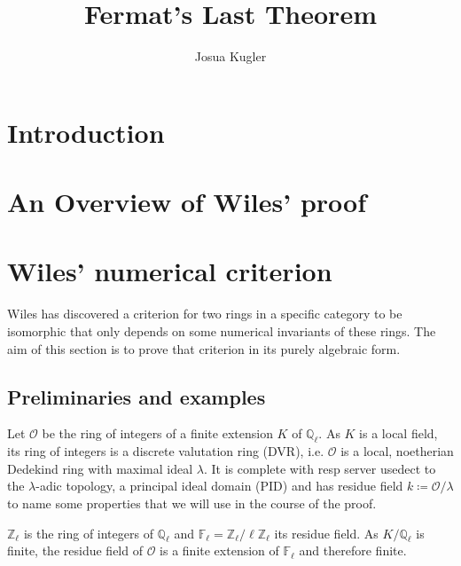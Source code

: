 \documentclass{article}
\title{Fermat's Last Theorem}
\author{Josua Kugler}
\theoremstyle{plain}%
\theoremstyle{definition}
\theoremstyle{remark}
\begin{document}
    \maketitle
    \tableofcontents
    \section{Introduction}
    \section{An Overview of Wiles' proof}
    \newpage
    \section{Wiles' numerical criterion}
    Wiles has discovered a criterion for two rings in a specific category to be isomorphic that only depends on some numerical invariants
    of these rings. The aim of this section is to prove that criterion in its purely algebraic form. 
    
    \subsection{Preliminaries and examples}
    Let \(\mathcal{O}\) be the ring of integers of a finite extension \(K\) of \(\mathbb Q_\ell\). 
    As \(K\) is a local field, its ring of integers is a discrete valutation ring (DVR), i.e. 
    \(\mathcal O\) is a local, noetherian Dedekind ring with maximal ideal \(\lambda\). 
    It is complete with resp server usedect to the \(\lambda\)-adic topology, a principal ideal domain (PID) 
    and has residue field \(k \coloneqq \mathcal{O}/\lambda\)  to name some properties that we will use in the course of the proof.
    
    \(\mathbb Z_\ell\) is the ring of integers of \(\mathbb Q_\ell\) and \(\mathbb F_\ell = \mathbb Z_\ell/\ell \mathbb Z_\ell\) its residue field. 
    As \(K/\mathbb{Q}_\ell\) is finite, the residue field of \(\mathcal{O}\) is a finite extension of $\mathbb F_\ell$ and therefore finite. 
\end{document}
